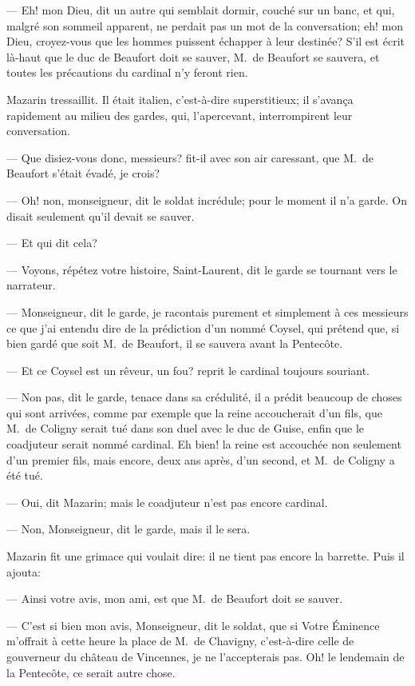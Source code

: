 — Eh! mon Dieu, dit un autre qui semblait dormir, couché sur un banc, et qui, malgré son sommeil apparent, ne perdait pas un mot de la conversation; eh! mon Dieu, croyez-vous que les hommes puissent échapper à leur destinée? S'il est écrit là-haut que le duc de Beaufort doit se sauver, M.~de Beaufort se sauvera, et toutes les précautions du cardinal n'y feront rien.

Mazarin tressaillit. Il était italien, c'est-à-dire superstitieux; il s'avança rapidement au milieu des gardes, qui, l'apercevant, interrompirent leur conversation.

— Que disiez-vous donc, messieurs? fit-il avec son air caressant, que M.~de Beaufort s'était évadé, je crois?

— Oh! non, monseigneur, dit le soldat incrédule; pour le moment il n'a garde. On disait seulement qu'il devait se sauver.

— Et qui dit cela?

— Voyons, répétez votre histoire, Saint-Laurent, dit le garde se tournant vers le narrateur.

— Monseigneur, dit le garde, je racontais purement et simplement à ces messieurs ce que j'ai entendu dire de la prédiction d'un nommé Coysel, qui prétend que, si bien gardé que soit M.~de Beaufort, il se sauvera avant la Pentecôte.

— Et ce Coysel est un rêveur, un fou? reprit le cardinal toujours souriant.

— Non pas, dit le garde, tenace dans sa crédulité, il a prédit beaucoup de choses qui sont arrivées, comme par exemple que la reine accoucherait d'un fils, que M.~de Coligny serait tué dans son duel avec le duc de Guise, enfin que le coadjuteur serait nommé cardinal. Eh bien! la reine est accouchée non seulement d'un premier fils, mais encore, deux ans après, d'un second, et M.~de Coligny a été tué.

— Oui, dit Mazarin; mais le coadjuteur n'est pas encore cardinal.

— Non, Monseigneur, dit le garde, mais il le sera.

Mazarin fit une grimace qui voulait dire: il ne tient pas encore la barrette. Puis il ajouta:

— Ainsi votre avis, mon ami, est que M.~de Beaufort doit se sauver.

— C'est si bien mon avis, Monseigneur, dit le soldat, que si Votre Éminence m'offrait à cette heure la place de M.~de Chavigny, c'est-à-dire celle de gouverneur du château de Vincennes, je ne l'accepterais pas. Oh! le lendemain de la Pentecôte, ce serait autre chose.

